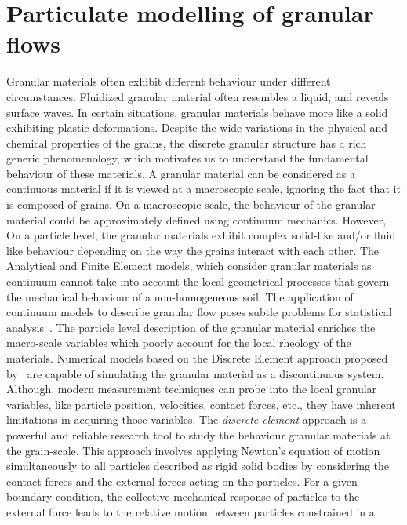 \section{Particulate modelling of granular flows}

Granular materials often exhibit different behaviour under different 
circumstances. Fluidized 
granular material often resembles a liquid, and reveals surface waves. In 
certain situations, 
granular materials behave more like a solid exhibiting plastic deformations. 
Despite the wide 
variations in the physical and chemical properties of the grains, the discrete 
granular structure 
has a rich generic phenomenology, which motivates us to understand the 
fundamental behaviour of 
these materials. A granular material can be considered as a continuous material 
if it is viewed at 
a macroscopic scale, ignoring the fact that it is composed of grains. On a 
macroscopic scale, the 
behaviour of the granular material could be approximately defined using 
continuum mechanics. 
However, On a particle level, the granular materials exhibit complex solid-like 
and/or fluid like 
behaviour depending on the way the grains interact with each other. The 
Analytical and Finite 
Element models, which consider granular materials as continuum cannot take into 
account the local 
geometrical processes that govern the mechanical behaviour of a non-homogeneous 
soil. The 
application of continuum models to describe granular flow poses subtle problems 
for statistical 
analysis~\citep{mehta1994}. The particle level description of the granular 
material enriches the 
macro-scale variables which poorly account for the local rheology of the 
materials. Numerical 
models based on the Discrete Element approach proposed by~\citet{Cundall1979} 
are capable of  
simulating the granular material as a discontinuous system. Although, modern 
measurement 
techniques 
can probe into the local granular variables, like particle position, 
velocities, contact forces, 
etc., they have inherent limitations in acquiring those variables. The 
\textit{discrete-element} 
approach is a powerful and reliable research tool to study the behaviour 
granular materials at the 
grain-scale. This approach involves applying Newton's equation of motion 
simultaneously to all 
particles described as rigid solid bodies by considering the contact forces and 
the external 
forces 
acting on the particles. For a given boundary condition, the collective 
mechanical response of 
particles to the external force leads to the relative motion between particles 
constrained in a 
